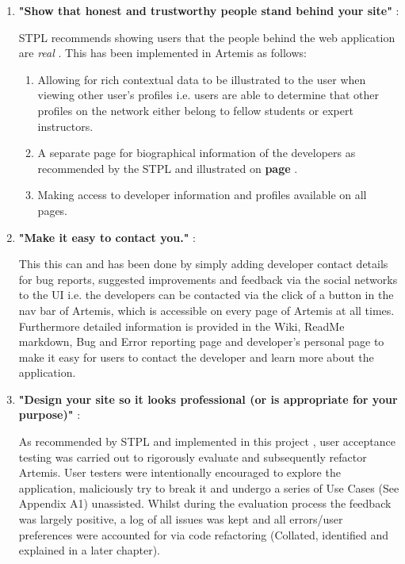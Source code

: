 \begin{enumerate}
    \item \textbf{"Show that honest and trustworthy people stand behind your site"} \cite{Fogg2002a}:
    
    STPL recommends showing users that the people behind the web application are \textit{real} \cite{Fogg2002a}. This has been implemented in Artemis as follows:
    \begin{enumerate}
        \item Allowing for rich contextual data to be illustrated to the user when viewing other user's profiles i.e. users are able to determine that other profiles on the network either belong to fellow students or expert instructors.
        \item A separate page for biographical information of the developers as recommended by the STPL \cite{Fogg2002a} and illustrated on \textbf{page \pageref{developer}}.
        \item Making access to developer information and profiles available on all pages.
    \end{enumerate}
    
    \item \textbf{"Make it easy to contact you."} \cite{Fogg2002a}:
    
    This this can and has been done by simply adding developer contact details for bug reports, suggested improvements and feedback via the social networks to the UI i.e. the developers can be contacted via the click of a button in the nav bar of Artemis, which is accessible on every page of Artemis at all times. Furthermore detailed information is provided in the Wiki, ReadMe markdown, Bug and Error reporting page and developer's personal page to make it easy for users to contact the developer and learn more about the application.

    \item \textbf{"Design your site so it looks professional (or is appropriate for your purpose)"} \cite{Fogg2002a}:
    
    As recommended by STPL and implemented in this project , user acceptance testing was carried out to rigorously evaluate and subsequently refactor Artemis. User testers were intentionally encouraged to explore the application,  maliciously try to break it and undergo a series of Use Cases (See Appendix A1) unassisted. Whilst during the evaluation process the feedback was largely positive, a log of all issues was kept and all errors/user preferences were accounted for via code refactoring (Collated, identified and explained in a later chapter).


\end{enumerate}
